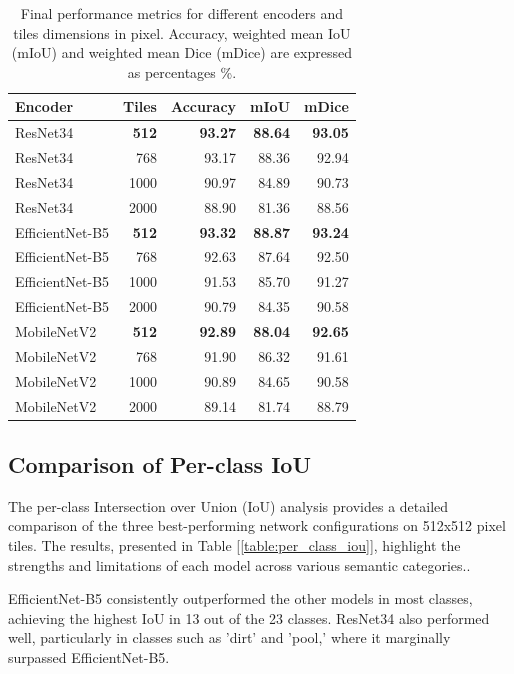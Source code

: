 \documentclass[a4paper]{article}
\begin{document}
\begin{table}[htbp]
    \centering
    \small
    \begin{tabular}{|l|r|r|r|r|}
    \hline
    \textbf{Encoder} & \textbf{Tiles} & \textbf{Accuracy} & \textbf{mIoU} & \textbf{mDice} \\ \hline
     ResNet34 & \textbf{512} & \textbf{93.27} & \textbf{88.64} & \textbf{93.05} \\ \hline
    ResNet34 & 768 & 93.17 & 88.36 & 92.94 \\ \hline
    ResNet34 & 1000 & 90.97 & 84.89 & 90.73 \\ \hline
    ResNet34 & 2000 & 88.90 & 81.36 & 88.56 \\ \hline
    EfficientNet-B5 & \textbf{512} & \textbf{93.32} & \textbf{88.87} & \textbf{93.24} \\ \hline
    EfficientNet-B5 & 768 & 92.63 & 87.64 & 92.50 \\ \hline
    EfficientNet-B5 & 1000 & 91.53 & 85.70 & 91.27 \\ \hline
    EfficientNet-B5 & 2000 & 90.79 & 84.35 & 90.58 \\ \hline
    MobileNetV2 & \textbf{512} & \textbf{92.89} & \textbf{88.04} & \textbf{92.65} \\ \hline
    MobileNetV2 & 768 & 91.90 & 86.32 & 91.61 \\ \hline
    MobileNetV2 & 1000 & 90.89 & 84.65 & 90.58 \\ \hline
    MobileNetV2 & 2000 & 89.14 & 81.74 & 88.79 \\ \hline
    \end{tabular}
    \caption{Final performance metrics for different encoders and tiles dimensions in pixel. Accuracy, weighted mean IoU (mIoU) and weighted mean Dice (mDice) are expressed as percentages \%.}
    \label{table:performance_metrics}
\end{table}

\subsection{Comparison of Per-class IoU}
The per-class Intersection over Union (IoU) analysis provides a detailed comparison of the three best-performing network configurations on 512x512 pixel tiles. The results, presented in Table [\ref{table:per_class_iou}], highlight the strengths and limitations of each model across various semantic categories.. 

EfficientNet-B5 consistently outperformed the other models in most classes, achieving the highest IoU in 13 out of the 23 classes. ResNet34 also performed well, particularly in classes such as 'dirt' and 'pool,' where it marginally surpassed EfficientNet-B5.
\end{document}
